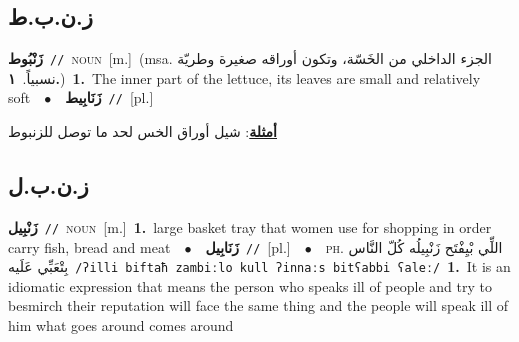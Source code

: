 \documentclass[10pt,a4paper,twoside]{article} %
\begin{document}
\begin{multicols}{2}
\vspace{-3mm}
\subsection*{\color{blue}\foreignlanguage{arabic}{ز.ن.ب.ط}\color{blue}{}} 

{\setlength\topsep{0pt}\textbf{\foreignlanguage{arabic}{زَنْبُوط}}\ {\color{gray}\texttt{//}\color{black}}\ \textsc{noun}\ [m.]\ \color{gray}(msa. \foreignlanguage{arabic}{الجزء الداخلي من الخَسّة، وتكون أوراقه صغيرة وطريّة نسبياً.}~\foreignlanguage{arabic}{\textbf{١.}})\color{black}\ \textbf{1.}~The inner part of the lettuce, its leaves are small and relatively soft\ \ $\bullet$\ \ \setlength\topsep{0pt}\textbf{\foreignlanguage{arabic}{زَنَابِيط}}\ {\color{gray}\texttt{//}\color{black}}\ [pl.]\  \begin{flushright}\color{gray}\foreignlanguage{arabic}{\textbf{\underline{\foreignlanguage{arabic}{أمثلة}}}: شيل أوراق الخس لحد ما توصل للزنبوط}\end{flushright}\color{black}} \vspace{2mm}

\vspace{-3mm}
\subsection*{\color{blue}\foreignlanguage{arabic}{ز.ن.ب.ل}\color{blue}{}} 

{\setlength\topsep{0pt}\textbf{\foreignlanguage{arabic}{زَنْبِيل}}\ {\color{gray}\texttt{//}\color{black}}\ \textsc{noun}\ [m.]\ \textbf{1.}~large basket tray that women use for shopping in order carry fish, bread and meat\ \ $\bullet$\ \ \setlength\topsep{0pt}\textbf{\foreignlanguage{arabic}{زَنَابِيل}}\ {\color{gray}\texttt{//}\color{black}}\ [pl.]\ \ $\bullet$\ \ \textsc{ph.} \color{gray} \foreignlanguage{arabic}{اللِّي بْيِفْتَح زَنْبِيلُه كُلّ النَّاس بِتْعَبِّي عَلَيه}\color{black}\ {\color{gray}\texttt{/{\sffamily ʔilli biftaħ zambiːlo kull ʔinnaːs bitʕabbi ʕaleː}/}\color{black}}\ \textbf{1.}~It is an idiomatic expression that means the person who speaks ill of people and try to besmirch their reputation will face the same thing and the people will speak ill of him what goes around comes around\ } \vspace{2mm}


\end{multicols}
\end{document}
